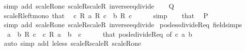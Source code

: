 \begin{isabellebody}
\ {\isacharparenleft}{\kern0pt}simp\ add{\isacharcolon}{\kern0pt}\ scaleR{\isacharunderscore}{\kern0pt}one\ scaleR{\isacharunderscore}{\kern0pt}scaleR\ inverse{\isacharunderscore}{\kern0pt}eq{\isacharunderscore}{\kern0pt}divide{\isacharparenright}{\kern0pt}\isanewline
{}\isamarkupfalse%
\isanewline
\ \ \isamarkupfalse%
\ {\isacharquery}{\kern0pt}Q\isanewline
\ \ \isamarkupfalse%
\ scaleR{\isacharunderscore}{\kern0pt}left{\isacharunderscore}{\kern0pt}mono\ that\ \isamarkupfalse%
\ {\isachardoublequoteopen}c\ {\isacharasterisk}{\kern0pt}\isactrlsub R\ a\ {\isacharslash}{\kern0pt}\isactrlsub R\ c\ {\isasymle}\ b\ {\isacharslash}{\kern0pt}\isactrlsub R\ c{\isachardoublequoteclose}\isanewline
\ \ \ \ \isamarkupfalse%
\ simp\isanewline
\ \ \isamarkupfalse%
\ that\ \isamarkupfalse%
\ {\isacharquery}{\kern0pt}P\isanewline
\ \ \ \ \isamarkupfalse%
\ {\isacharparenleft}{\kern0pt}simp\ add{\isacharcolon}{\kern0pt}\ scaleR{\isacharunderscore}{\kern0pt}one\ scaleR{\isacharunderscore}{\kern0pt}scaleR\ inverse{\isacharunderscore}{\kern0pt}eq{\isacharunderscore}{\kern0pt}divide{\isacharparenright}{\kern0pt}\isanewline
{}\isamarkupfalse%
%
\endisatagproof
{\isafoldproof}%
%
\isadelimproof
\isanewline
%
\endisadelimproof
\isanewline
{}\isamarkupfalse%
\ pos{\isacharunderscore}{\kern0pt}less{\isacharunderscore}{\kern0pt}divideR{\isacharunderscore}{\kern0pt}eq\ {\isacharbrackleft}{\kern0pt}field{\isacharunderscore}{\kern0pt}simps{\isacharbrackright}{\kern0pt}{\isacharcolon}{\kern0pt}\isanewline
\ \ {\isachardoublequoteopen}a\ {\isacharless}{\kern0pt}\ b\ {\isacharslash}{\kern0pt}\isactrlsub R\ c\ {\isasymlongleftrightarrow}\ c\ {\isacharasterisk}{\kern0pt}\isactrlsub R\ a\ {\isacharless}{\kern0pt}\ b{\isachardoublequoteclose}\ \ {\isachardoublequoteopen}c\ {\isachargreater}{\kern0pt}\ {}{\isachardoublequoteclose}\isanewline
%
\isadelimproof
\ \ %
\endisadelimproof
%
\isatagproof
{}\isamarkupfalse%
\ that\ pos{\isacharunderscore}{\kern0pt}le{\isacharunderscore}{\kern0pt}divideR{\isacharunderscore}{\kern0pt}eq\ {\isacharbrackleft}{\kern0pt}of\ c\ a\ b{\isacharbrackright}{\kern0pt}\isanewline
\ \ \isamarkupfalse%
\ {\isacharparenleft}{\kern0pt}auto\ simp\ add{\isacharcolon}{\kern0pt}\ le{\isacharunderscore}{\kern0pt}less\ scaleR{\isacharunderscore}{\kern0pt}scaleR\ scaleR{\isacharunderscore}{\kern0pt}one{\isacharparenright}{\kern0pt}%
\endisatagproof
{\isafoldproof}%

\end{isabellebody}
